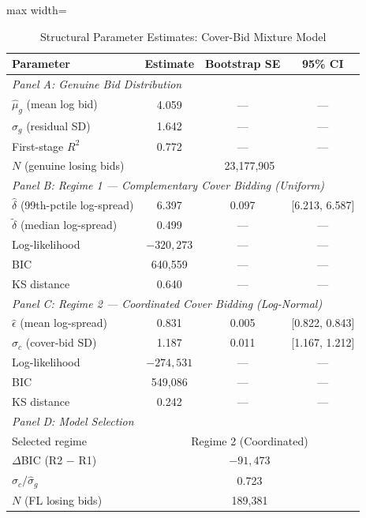 
\begin{table}[htbp]
\centering
\caption{Structural Parameter Estimates: Cover-Bid Mixture Model}
\label{tab:structural_params}
\begin{adjustbox}{max width=\textwidth}
\begin{threeparttable}
\small
\begin{tabular}{lccc}
\toprule
Parameter & Estimate & Bootstrap SE & 95\% CI \\
\midrule
\multicolumn{4}{l}{\textit{Panel A: Genuine Bid Distribution}} \\[3pt]
$\hat{\mu}_g$ (mean log bid) & 4.059 & --- & --- \\
$\hat{\sigma}_g$ (residual SD) & 1.642 & --- & --- \\
First-stage $R^2$ & 0.772 & --- & --- \\
$N$ (genuine losing bids) & \multicolumn{3}{c}{23,177,905} \\
\midrule
\multicolumn{4}{l}{\textit{Panel B: Regime 1 --- Complementary Cover Bidding (Uniform)}} \\[3pt]
$\hat{\delta}$ (99th-pctile log-spread) & 6.397 & 0.097 & [6.213, 6.587] \\
$\tilde{\delta}$ (median log-spread) & 0.499 & --- & --- \\
Log-likelihood & $-320,273$ & --- & --- \\
BIC & 640,559 & --- & --- \\
KS distance & 0.640 & --- & --- \\
\midrule
\multicolumn{4}{l}{\textit{Panel C: Regime 2 --- Coordinated Cover Bidding (Log-Normal)}} \\[3pt]
$\hat{\epsilon}$ (mean log-spread) & 0.831 & 0.005 & [0.822, 0.843] \\
$\hat{\sigma}_c$ (cover-bid SD) & 1.187 & 0.011 & [1.167, 1.212] \\
Log-likelihood & $-274,531$ & --- & --- \\
BIC & 549,086 & --- & --- \\
KS distance & 0.242 & --- & --- \\
\midrule
\multicolumn{4}{l}{\textit{Panel D: Model Selection}} \\[3pt]
Selected regime & \multicolumn{3}{c}{Regime 2 (Coordinated)} \\
$\Delta$BIC (R2 $-$ R1) & \multicolumn{3}{c}{$-91,473$} \\
$\hat{\sigma}_c / \hat{\sigma}_g$ & \multicolumn{3}{c}{0.723} \\
$N$ (FL losing bids) & \multicolumn{3}{c}{189,381} \\

\end{tabular}
\end{threeparttable}
\end{adjustbox}
\end{table}
